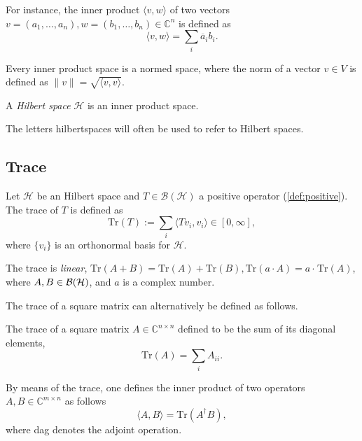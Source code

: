 For instance, the inner product $ \langle v, w \rangle$ of two vectors $ v = (a_1, \ldots, a_n ),w = (b_1, \ldots, b_n) \in \mathbb{C}^{n}$ is defined as
\begin{equation*}
  \langle v, w \rangle = \sum_{i} \overline{a}_i b_i. 
\end{equation*}

Every inner product space is a normed space, where the norm of a vector $v \in V$ is defined as $\|v\| = \sqrt{\langle v, v \rangle}$.


\begin{definition}
  A \emph{Hilbert space} $\mathcal{H}$ is an inner product space.
\end{definition}


The letters \gls{hilbertspaces} will often be used to refer to Hilbert spaces.





\subsection{Trace}

\begin{definition} \label{def:trace} 
  Let $\mathcal{H}$ be an Hilbert space and $ T \in \mathcal{B}(\mathcal{H})$ a positive operator (\autoref{def:positive}). The trace of $T$ is defined as 
\[
\text{Tr}(T) := \sum_i \langle T v_i, v_i \rangle \in [0, \infty],
\]
where $\{v_i\}$ is an orthonormal basis for $\mathcal{H}$.
\end{definition}


The trace is \emph{linear}, $\text{Tr}(A + B) = \text{Tr}(A)+\text{Tr}(B), \text{Tr}(a \cdot A) = a\cdot \hspace{1pt} \text{Tr}(A)$, where $A, B \in \mathcal{B}(\mathcal{H})$, and $a$ is a complex number.

The trace of a square matrix can alternatively be defined as follows.

\begin{definition}
  The trace of a square matrix $A\in \mathbb{C}^{n\times n}$ defined to be the sum of its diagonal elements,
\begin{equation*}
  \text{Tr}(A)= \sum_{i} A_{ii}.
\end{equation*}

\end{definition}

By means of the trace, one defines the inner product of two operators $A,B\in \mathbb{C}^{m \times n}$ as follows
\begin{equation*} \label{eq:inner_product_matrix}
  \langle A, B \rangle = \text{Tr}(A^{\dagger}B),
\end{equation*}
where \gls{dag} denotes the adjoint operation.




